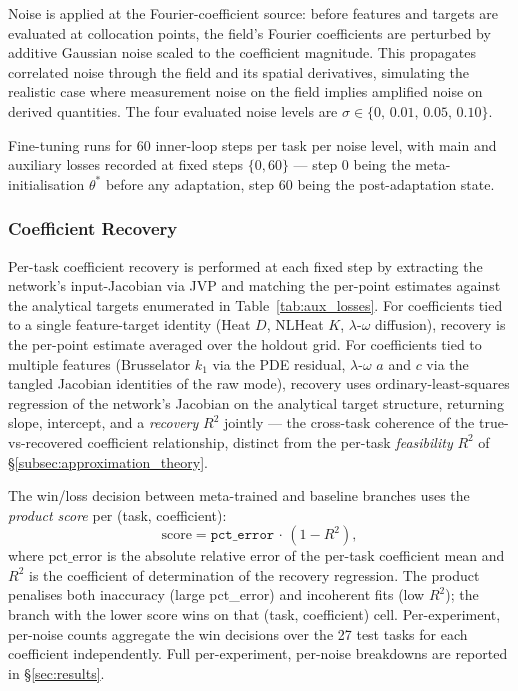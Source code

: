 \documentclass[10pt,journal,compsoc]{IEEEtran}
\begin{document}
Noise is applied at the Fourier-coefficient source: before features and
targets are evaluated at collocation points, the field's Fourier
coefficients are perturbed by additive Gaussian noise scaled to the
coefficient magnitude. This propagates correlated noise through the
field and its spatial derivatives, simulating the realistic case where
measurement noise on the field implies amplified noise on derived
quantities. The four evaluated noise levels are
$\sigma \in \{0,\, 0.01,\, 0.05,\, 0.10\}$.

Fine-tuning runs for $60$ inner-loop steps per task per noise level,
with main and auxiliary losses recorded at fixed steps $\{0, 60\}$ ---
step $0$ being the meta-initialisation $\theta^*$ before any adaptation,
step $60$ being the post-adaptation state.

\subsubsection{Coefficient Recovery}\label{subsubsec:coefficient_recovery}

Per-task coefficient recovery is performed at each fixed step by
extracting the network's input-Jacobian via JVP and matching the
per-point estimates against the analytical targets enumerated in
Table~\ref{tab:aux_losses}. For coefficients tied to a single
feature-target identity (Heat $D$, NLHeat $K$, $\lambda$-$\omega$
diffusion), recovery is the per-point estimate averaged over the
holdout grid. For coefficients tied to multiple features
(Brusselator $k_1$ via the PDE residual, $\lambda$-$\omega$ $a$ and $c$
via the tangled Jacobian identities of the raw mode), recovery uses
ordinary-least-squares regression of the network's Jacobian on the
analytical target structure, returning slope, intercept, and a
\emph{recovery} $R^2$ jointly --- the cross-task coherence of the
true-vs-recovered coefficient relationship, distinct from the per-task
\emph{feasibility} $R^2$ of \S\ref{subsec:approximation_theory}.

The win/loss decision between meta-trained and baseline branches uses
the \emph{product score} per (task, coefficient):
\begin{equation}\label{eq:product_score}
\text{score} = \texttt{pct\_error} \,\cdot\, (1 - R^2),
\end{equation}
where $\text{pct\_error}$ is the absolute relative error of the per-task
coefficient mean and $R^2$ is the coefficient of determination of the
recovery regression. The product penalises both inaccuracy (large
pct\_error) and incoherent fits (low $R^2$); the branch with the lower
score wins on that (task, coefficient) cell. Per-experiment, per-noise
counts aggregate the win decisions over the 27 test tasks for each
coefficient independently. Full per-experiment, per-noise breakdowns
are reported in \S\ref{sec:results}.
\end{document}
